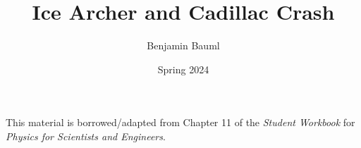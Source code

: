 \documentclass[]{article}
\title{Ice Archer and Cadillac Crash}
\author{Benjamin Bauml}
\date{Spring 2024}
\newcommand{\FileDepth}{../..}
\begin{document}
\maketitle
\begin{center}
	This material is borrowed/adapted from Chapter 11 of the \textit{Student Workbook} for \textit{Physics for Scientists and Engineers}.
\end{center}


\end{document}
